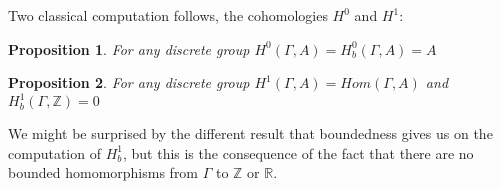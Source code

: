 \documentclass[leqno]{article}
\newtheorem*{proposition}{Proposition}
\begin{document}
Two classical computation follows, the cohomologies $H^0$ and  $H^1$:

\begin{proposition}
For any discrete group $H^0(\Gamma , A) = H^0_{b} (\Gamma , A) = A$
\end{proposition}

\begin{proposition}
For any discrete group $H^1(\Gamma , A) = Hom(\Gamma , A)$  and  $H^1_{b} (\Gamma , \mathbb{Z}) = 0$
\end{proposition}

We might be surprised by the different result that boundedness gives us on the computation of $H^1_{b}$, but this is the consequence of the fact that there are no bounded homomorphisms from $\Gamma $ to $\mathbb{Z}$ or $\mathbb{R}$.
\end{document}
